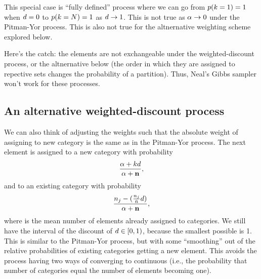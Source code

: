 This special case is ``fully defined'' process where we can
go from $p(k = 1) = 1$ when $d = 0$ to
$p(k = N) = 1$ as $d \to 1$.
This is not true as $\alpha \to 0$ under the Pitman-Yor process.
This is also not true for the altnernative weighting scheme explored below.

Here's the catch: the elements are not exchangeable under the weighted-discount
process, or the altnernative below (the order in which they are assigned to
repective sets changes the probability of a partition).
Thus, Neal's Gibbs sampler won't work for these processes.


\subsection{An alternative weighted-discount process}

We can also think of adjusting the weights such that the absolute weight of
assigning to new category is the same as in the Pitman-Yor process.
The next element is assigned to
a new category with probability
\begin{equation}
    \frac{\concentration + \numcats\discount}{\concentration + \numassignedtotal},
    \label{eq:pywdprobnew}
\end{equation}
and to an existing category with probability
\begin{equation}
    \frac{\numassigned[\catindex] - (\frac{\numassigned[\catindex]}{\numassignedmean}\discount)}{\concentration + \numassignedtotal},
    \label{eq:pywdprobexisting}
\end{equation}
where \numassignedmean is the mean number of elements already assigned to
categories.  We still have the interval of the discount of $d \in [0,
1)$, because the smallest possible \numassignedmean is 1.
This is similar to the Pitman-Yor process, but with some ``smoothing'' out of
the relative probabilities of existing categories getting a new element.
This avoids the process having two ways of converging to continuous
(i.e., the probability that number of categories equal the number of
elements becoming one).
